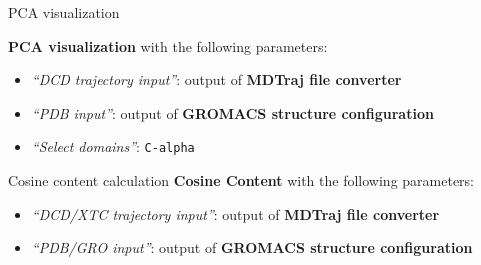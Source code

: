 \documentclass[twocolumn]{bmcart}%
\providecommand{\tightlist}{%
  \setlength{\itemsep}{0pt}\setlength{\parskip}{0pt}}
\begin{document}
\begin{handson_box_colour}{PCA visualization}

  \textbf{PCA visualization} with the following parameters:

  \begin{itemize}
  \tightlist
  \item
    \emph{``DCD trajectory input''}: output of
    \textbf{MDTraj file converter}
  \item
    \emph{``PDB input''}: output of \textbf{GROMACS
    structure configuration}
  \item
    \emph{``Select domains''}: \texttt{C-alpha}
  \end{itemize}



\end{handson_box_colour}
\begin{handson_box_colour}{Cosine content calculation}
  \textbf{Cosine Content} with the following parameters:

  \begin{itemize}
  \tightlist
  \item
    \emph{``DCD/XTC trajectory input''}: output of
    \textbf{MDTraj file converter}
  \item
    \emph{``PDB/GRO input''}: output of \textbf{GROMACS
    structure configuration}
  \end{itemize}



\end{handson_box_colour}
\end{document}
